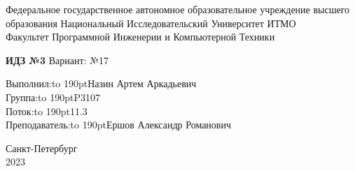 \newpage
\begin{titlepage}
    \fontsize{12pt}{14.4pt}
    \selectfont
    \begin{center}
        Федеральное государственное автономное
        образовательное учреждение высшего образования
        Национальный Исследовательский Университет ИТМО \\
        Факультет Программной Инженерии и Компьютерной Техники
    \end{center}

    \vspace{11em}

    \begin{center}
        \large{\textbf{ИДЗ №3} \linebreak
        Вариант: №17 \linebreak}
    \end{center}

    \vspace{18em}




    \hfill\parbox{10cm}{
        Выполнил:\hfill\hbox to 190pt{Назин Артем Аркадьевич\hfill}\\
        Группа:\hfill\hbox to 190pt{P3107\hfill}\\
        Поток:\hfill\hbox to 190pt{11.3\hfill}\\
        Преподаватель:\hfill\hbox to 190pt{Ершов Александр Романович\hfill}
    }


    \vspace{\fill}

    \begin{center}
        Санкт-Петербург \\2023
    \end{center}
    
\end{titlepage}